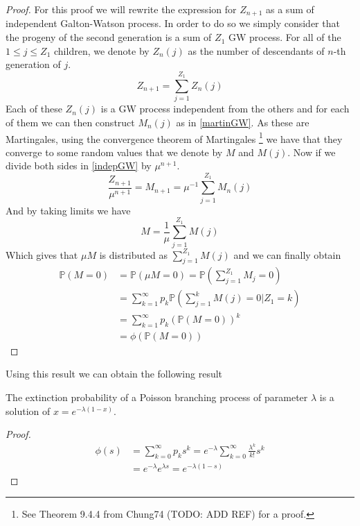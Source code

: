 \begin{proof}
	For this proof we will rewrite the expression for $Z_{n+1}$ as a sum of independent Galton-Watson process. 
	In order to do so we simply consider that the progeny of the second generation is a sum of $Z_1$ GW process.
	For all of the $1 \leq j \leq Z_1$ children, we denote by $Z_n(j)$ as the number of descendants of $n$-th generation of $j$.
	\begin{equation}\label{indepGW}
		Z_{n+1} = \sum_{j=1}^{Z_1} Z_n(j)
	\end{equation}
	Each of these $Z_n(j)$ is a GW process independent from the others and for each of them we can then construct $M_n(j)$ as in \eqref{martinGW}.
	As these are Martingales, using the convergence theorem of Martingales
	\footnote{See Theorem 9.4.4 from Chung74 (TODO: ADD REF) for a proof.}
	we have that they converge to some random values that we denote by $M$ and $M(j)$.
	Now if we divide both sides in \eqref{indepGW} by $\mu^{n+1}$.
	\begin{equation}
		\frac{Z_{n+1}}{\mu^{n+1}} = M_{n+1} = \mu^{-1} \sum_{j=1}^{Z_1} M_n(j)
	\end{equation}
	And by taking limits we have
	\begin{equation}
		M = \frac{1}{\mu} \sum_{j=1}^{Z_1}M(j)
	\end{equation}
	Which gives that $\mu M$ is distributed as $\sum_{j=1}^{Z_1}M(j)$ and we can finally obtain
	\begin{align}
		\mathbb{P}(M = 0) 	&= \mathbb{P}(\mu M = 0) = \mathbb{P}(\sum_{j=1}^{Z_1}M_j = 0) \\
					&= \sum_{k=1}^{\infty} p_k \mathbb{P}(\sum_{j=1}^{k} M(j) = 0 | Z_1 = k) \\
					&= \sum_{k=1}^{\infty} p_k (\mathbb{P}(M=0))^k\\
					&= \phi(\mathbb{P}(M=0))
	\end{align}
\end{proof}
Using this result we can obtain the following result
\begin{theorem}
	The extinction probability of a Poisson branching process of parameter $\lambda$ is a solution of $x = e^{-\lambda(1-x)}$.
\end{theorem}
\begin{proof}
	\begin{align}
		\phi(s) &= \sum_{k=0}^{\infty} p_k s^k = e^{-\lambda} \sum_{k=0}^{\infty} \frac{\lambda ^k}{k!} s^k\\
			&= e^{-\lambda}e^{\lambda s} = e^{-\lambda(1 -s)}
	\end{align}
\end{proof}


